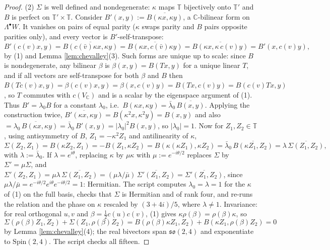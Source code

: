 \documentclass[11pt]{article}
\theoremstyle{definition}
\newcommand{\C}{\mathbb{C}}
\newcommand{\T}{\mathbb{T}}
\begin{document}
\begin{proof}
(2) $\Sigma$ is well defined and nondegenerate: $\kappa$ maps $\T$ bijectively onto $\T'$ and $B$ is perfect on $\T'\times\T$. Consider $B'(x, y) := \overline{B(\kappa x, \kappa y)}$, a $\C$-bilinear form on $\Lambda^\bullet W$. It vanishes on pairs of equal parity ($\kappa$ swaps parity and $B$ pairs opposite parities only), and every vector is $B'$-self-transpose:
\[
B'(c(v)x, y) = \overline{B(c(\bar v)\kappa x, \kappa y)} = \overline{B(\kappa x, c(\bar v)\kappa y)} = \overline{B(\kappa x, \kappa\, c(v) y)} = B'(x, c(v) y),
\]
by (1) and Lemma \ref{lem:chevalley}(3). Such forms are unique up to scale: since $B$ is nondegenerate, any bilinear $\beta$ is $\beta(x,y) = B(Tx, y)$ for a unique linear $T$, and if all vectors are self-transpose for both $\beta$ and $B$ then $B(Tc(v)x, y) = \beta(c(v)x, y) = \beta(x, c(v)y) = B(Tx, c(v)y) = B(c(v)Tx, y)$, so $T$ commutes with $c(V_\C)$ and is a scalar by the eigenspace argument of (1). Thus $B' = \lambda_0 B$ for a constant $\lambda_0$, i.e.\ $B(\kappa x, \kappa y) = \bar\lambda_0\,\overline{B(x,y)}$. Applying the construction twice, $\overline{B'(\kappa x, \kappa y)} = B(\kappa^2 x, \kappa^2 y) = B(x, y)$ and also $= \overline{\lambda_0\,B(\kappa x, \kappa y)} = \bar\lambda_0\, B'(x,y) = |\lambda_0|^2 B(x,y)$, so $|\lambda_0| = 1$. Now for $Z_1, Z_2 \in \T$, using antisymmetry of $B$, $Z_1 = -\kappa^2 Z_1$ and antilinearity of $\kappa$,
\[
\Sigma(Z_2, Z_1) = B(\kappa Z_2, Z_1) = -B(Z_1, \kappa Z_2) = B(\kappa(\kappa Z_1), \kappa Z_2) = \bar\lambda_0\,\overline{B(\kappa Z_1, Z_2)} = \lambda\,\overline{\Sigma(Z_1, Z_2)},
\]
with $\lambda := \bar\lambda_0$.
If $\lambda = e^{i\theta}$, replacing $\kappa$ by $\mu\kappa$ with $\mu := e^{-i\theta/2}$ replaces $\Sigma$ by $\Sigma' = \mu\Sigma$, and $\Sigma'(Z_2,Z_1) = \mu\lambda\,\overline{\Sigma(Z_1,Z_2)} = (\mu\lambda/\bar\mu)\,\overline{\Sigma'(Z_1,Z_2)} = \overline{\Sigma'(Z_1,Z_2)}$, since $\mu\lambda/\bar\mu = e^{-i\theta/2}e^{i\theta}e^{-i\theta/2} = 1$: Hermitian. The script computes $\lambda_0 = \lambda = 1$ for the $\kappa$ of (1) on the full basis, checks that $\Sigma$ is Hermitian and of rank four, and re-runs the relation and the phase on $\kappa$ rescaled by $(3+4i)/5$, where $\lambda \neq 1$. Invariance: for real orthogonal $u, v$ and $\beta = \tfrac12 c(u)c(v)$, (1) gives $\kappa\rho(\beta) = \rho(\beta)\kappa$, so
\[
\Sigma(\rho(\beta)Z_1, Z_2) + \Sigma(Z_1, \rho(\beta)Z_2) = B(\rho(\beta)\kappa Z_1, Z_2) + B(\kappa Z_1, \rho(\beta) Z_2) = 0
\]
by Lemma \ref{lem:chevalley}(4); the real bivectors span $\mathfrak{so}(2,4)$ and exponentiate to $\mathrm{Spin}(2,4)$. The script checks all fifteen.


\end{proof}
\end{document}
